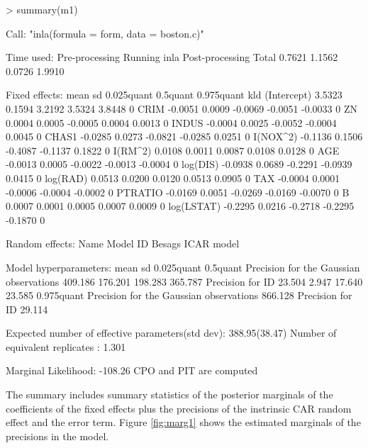 \documentclass[article]{jss}
\begin{document}
\begin{Schunk}
\begin{Sinput}
> summary(m1)
\end{Sinput}
\begin{Soutput}
Call:
"inla(formula = form, data = boston.c)"

Time used:
 Pre-processing    Running inla Post-processing           Total 
         0.7621          1.1562          0.0726          1.9910 

Fixed effects:
               mean     sd 0.025quant 0.5quant 0.975quant kld
(Intercept)  3.5323 0.1594     3.2192   3.5324     3.8448   0
CRIM        -0.0051 0.0009    -0.0069  -0.0051    -0.0033   0
ZN           0.0004 0.0005    -0.0005   0.0004     0.0013   0
INDUS       -0.0004 0.0025    -0.0052  -0.0004     0.0045   0
CHAS1       -0.0285 0.0273    -0.0821  -0.0285     0.0251   0
I(NOX^2)    -0.1136 0.1506    -0.4087  -0.1137     0.1822   0
I(RM^2)      0.0108 0.0011     0.0087   0.0108     0.0128   0
AGE         -0.0013 0.0005    -0.0022  -0.0013    -0.0004   0
log(DIS)    -0.0938 0.0689    -0.2291  -0.0939     0.0415   0
log(RAD)     0.0513 0.0200     0.0120   0.0513     0.0905   0
TAX         -0.0004 0.0001    -0.0006  -0.0004    -0.0002   0
PTRATIO     -0.0169 0.0051    -0.0269  -0.0169    -0.0070   0
B            0.0007 0.0001     0.0005   0.0007     0.0009   0
log(LSTAT)  -0.2295 0.0216    -0.2718  -0.2295    -0.1870   0

Random effects:
Name	  Model
 ID   Besags ICAR model 

Model hyperparameters:
                                        mean    sd      0.025quant 0.5quant
Precision for the Gaussian observations 409.186 176.201 198.283    365.787 
Precision for ID                         23.504   2.947  17.640     23.585 
                                        0.975quant
Precision for the Gaussian observations 866.128   
Precision for ID                         29.114   

Expected number of effective parameters(std dev): 388.95(38.47)
Number of equivalent replicates : 1.301 

Marginal Likelihood:  -108.26 
CPO and PIT are computed
\end{Soutput}
\end{Schunk}
\noindent
The summary includes summary statistics of the posterior marginals of the
coefficients of the fixed effects plus the precisions of the instrinsic CAR
random effect and the error term. Figure \ref{fig:marg1} shows the estimated
marginals of the precisions in the model.
\end{document}
